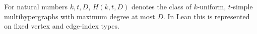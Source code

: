 \begin{definition}
For natural numbers $k,t,D$, $H(k,t,D)$ denotes the class of
$k$-uniform, $t$-simple multihypergraphs with maximum degree at most $D$.
In Lean this is represented on fixed vertex and edge-index types.
\end{definition}
